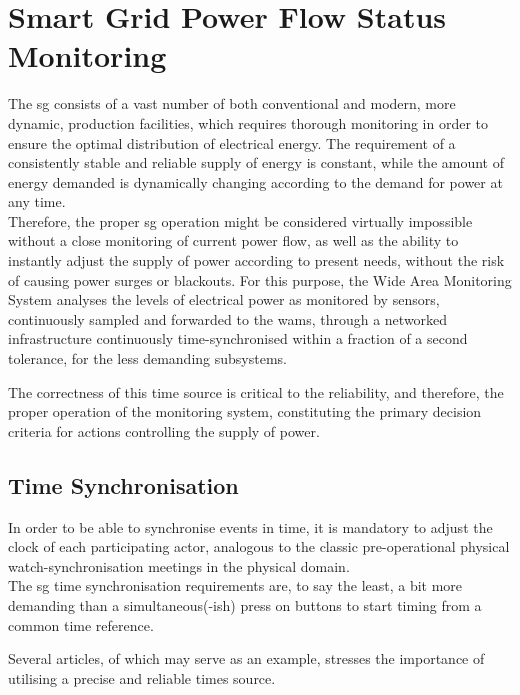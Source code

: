 \chapter{Smart Grid Power Flow Status Monitoring}

The \acrshort{sg} consists of a vast number of both conventional and modern, more dynamic, production facilities, which requires thorough monitoring in order to ensure the optimal distribution of electrical energy. The requirement of a consistently stable and reliable supply of energy is constant, while the amount of energy demanded is dynamically changing according to the demand for power at any time. \\ 

Therefore, the proper \acrlong{sg} operation might be considered virtually impossible without a  close monitoring of current power flow, as well as the ability to instantly adjust the supply of power according to present needs,  without the risk of causing power surges or blackouts. For this purpose, the Wide Area Monitoring System analyses the levels of electrical power as monitored by sensors, continuously sampled and forwarded to the \acrshort{wams}, through  a networked infrastructure continuously time-synchronised within a fraction of a second tolerance, for the less demanding subsystems.


The correctness of this time source is critical to the reliability, and therefore, the proper operation of the monitoring system, constituting the primary decision criteria for actions controlling the supply of power.




\section{Time Synchronisation}

In order to be able to synchronise events in time, it is mandatory to adjust the clock of each participating actor, analogous to the classic pre-operational physical watch-synchronisation meetings in the physical domain. \\ 

The \acrshort{sg} time synchronisation requirements are, to say the least, a bit more demanding than a simultaneous(-ish) press on buttons to start timing from a common time reference.

Several articles, of which \cite{appasani2018review} may serve as an example, stresses the importance of utilising a precise and reliable times source.

